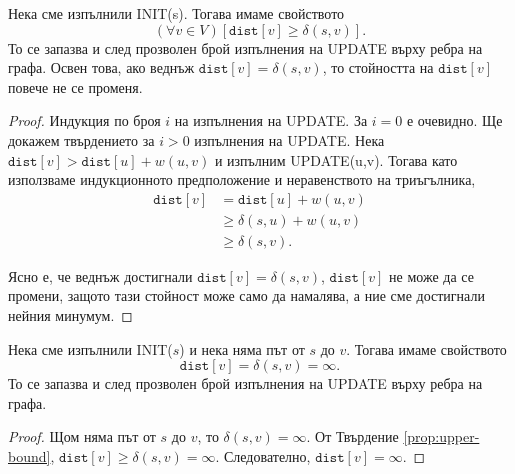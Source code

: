\begin{prop}
  \label{prop:upper-bound}
  Нека сме изпълнили INIT(s).
  Тогава имаме свойството \[(\forall v\in V)[\texttt{dist}[v] \geq \delta(s,v)].\]
  То се запазва и след прозволен брой изпълнения на UPDATE върху ребра на графа.
  Освен това, ако веднъж $\texttt{dist}[v] = \delta(s,v)$, то стойността на $\texttt{dist}[v]$
  повече не се променя.
\end{prop}
\begin{proof}
  Индукция по броя $i$ на изпълнения на UPDATE.
  За $i = 0$ е очевидно.
  Ще докажем твърдението за $i > 0$ изпълнения на UPDATE.
  Нека $\texttt{dist}[v] > \texttt{dist}[u] + w(u,v)$ и изпълним UPDATE(u,v).
  Тогава като използваме индукционното предположение и неравенството на триъгълника,
  \begin{align*}
    \texttt{dist}[v] & = \texttt{dist}[u] + w(u,v)\\
    & \geq \delta(s,u) + w(u,v)\\
    & \geq  \delta(s,v).
  \end{align*}

  Ясно е, че веднъж достигнали $\texttt{dist}[v] = \delta(s,v)$, $\texttt{dist}[v]$
  не може да се промени, защото тази стойност може само да намалява, а ние
  сме достигнали нейния минумум.
\end{proof}

\begin{prop}
  \label{prop:no-path}
  Нека сме изпълнили INIT($s$) и нека няма път от $s$ до $v$.
  Тогава имаме свойството
  \[\texttt{dist}[v] = \delta(s,v) = \infty.\]
  То се запазва и след прозволен брой изпълнения на UPDATE върху ребра на графа.
\end{prop}
\begin{proof}
  Щом няма път от $s$ до $v$, то $\delta(s,v) = \infty$.
  От Твърдение \ref{prop:upper-bound}, $\texttt{dist}[v] \geq \delta(s,v) = \infty$.
  Следователно, $\texttt{dist}[v] = \infty$.
\end{proof}

